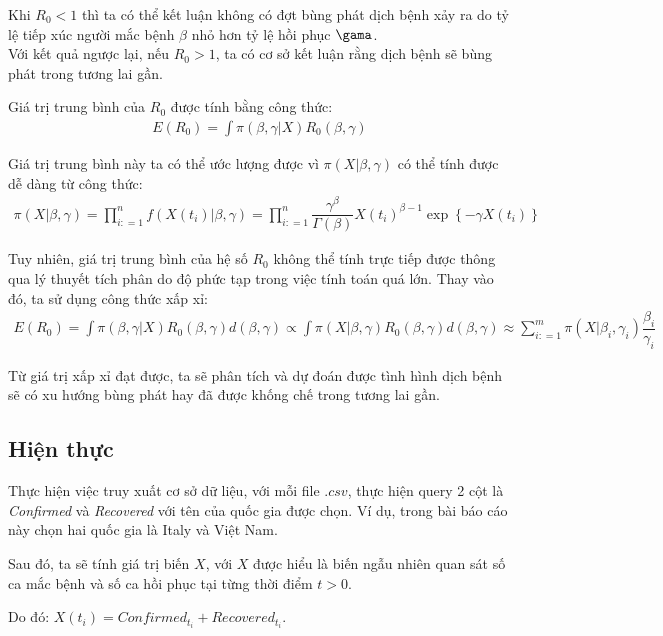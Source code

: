 \documentclass[a4paper]{article}
\begin{document}
Khi $R_0 < 1$ thì ta có thể kết luận không có đợt bùng phát dịch bệnh xảy ra do tỷ lệ tiếp xúc người mắc bệnh $\beta$ nhỏ hơn tỷ lệ hồi phục $\gama$. \\
Với kết quả ngược lại, nếu $R_0 > 1$, ta có cơ sở kết luận rằng dịch bệnh sẽ bùng phát trong tương lai gần.

Giá trị trung bình của $R_0$ được tính bằng công thức:
\begin{align}
    E(R_0) = \int {\pi (\beta ,\gamma |X)} {R_0}(\beta ,\gamma)
\end{align}

Giá trị trung bình này ta có thể ước lượng được vì $\pi(X | \beta, \gamma)$ có thể tính được dễ dàng từ công thức:
\begin{align}
    \pi (X|\beta ,\gamma ) = \prod\limits_{i: = 1}^n {f(X({t_i})|\beta ,\gamma )}  = \prod\limits_{i: = 1}^n {\dfrac{{{\gamma ^\beta }}}{{\Gamma (\beta )}}} X{({t_i})^{\beta  - 1}}\exp \left\{ { - \gamma X({t_i})} \right\}
\end{align}

Tuy nhiên, giá trị trung bình của hệ số $R_0$ không thể tính trực tiếp được thông qua lý thuyết tích phân do độ phức tạp trong việc tính toán quá lớn. Thay vào đó, ta sử dụng công thức xấp xỉ:
\begin{align}
    E({R_0}) = \int {\pi (\beta ,\gamma |X)} {R_0}(\beta ,\gamma )d(\beta ,\gamma ) \propto \int {\pi (X|\beta ,\gamma ){R_0}(\beta ,\gamma )d(\beta ,\gamma )}  \approx \sum\limits_{i: = 1}^m {\pi (X|{\beta _i},{\gamma _i})} \dfrac{{{\beta _i}}}{{{\gamma _i}}}
\end{align}

Từ giá trị xấp xỉ đạt được, ta sẽ phân tích và dự đoán được tình hình dịch bệnh sẽ có xu hướng bùng phát hay đã được khống chế trong tương lai gần.

\subsection{Hiện thực}

Thực hiện việc truy xuất cơ sở dữ liệu, với mỗi file $.csv$, thực hiện query 2 cột là \textit{Confirmed} và \textit{Recovered} với tên của quốc gia được chọn. Ví dụ, trong bài báo cáo này chọn hai quốc gia là Italy và Việt Nam.

Sau đó, ta sẽ tính giá trị biến $X$, với $X$ được hiểu là biến ngẫu nhiên quan sát số ca mắc bệnh và số ca hồi phục tại từng thời điểm $t>0$.

Do đó: $X(t_i) = Confirmed_{t_i} + Recovered_{t_i}$.
\end{document}
